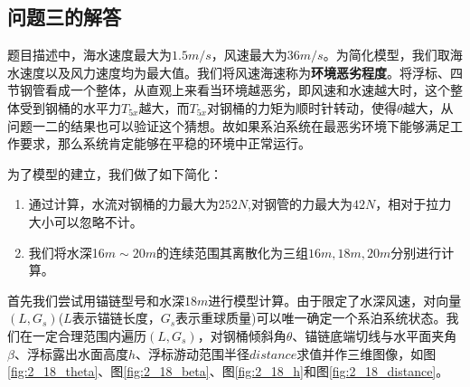 \documentclass{cumcm}
\begin{document}
\subsection{问题三的解答}
题目描述中，海水速度最大为$1.5m/s$，风速最大为$36m/s$。为简化模型，我们取海水速度以及风力速度均为最大值。我们将风速海速称为\textbf{环境恶劣程度}。将浮标、四节钢管看成一个整体，从直观上来看当环境越恶劣，即风速和水速越大时，这个整体受到钢桶的水平力$T_{5x}$越大，而$T_{5x}$对钢桶的力矩为顺时针转动，使得$\theta$越大，从问题一二的结果也可以验证这个猜想。故如果系泊系统在最恶劣环境下能够满足工作要求，那么系统肯定能够在平稳的环境中正常运行。\par
为了模型的建立，我们做了如下简化：
\begin{enumerate}
	\item 通过计算，水流对钢桶的力最大为$252N$,对钢管的力最大为$42N$，相对于拉力大小可以忽略不计。
	\item
	我们将水深16$m\sim 20m$的连续范围其离散化为三组$16m,18m,20m$分别进行计算。
\end{enumerate}\par 
首先我们尝试用锚链型号\uppercase\expandafter{}和水深$18m$进行模型计算。由于限定了水深风速，对向量\\$(L,G_s)$($L$表示锚链长度，$G_s$表示重球质量)可以唯一确定一个系泊系统状态。我们在一定合理范围内遍历$(L,G_s)$，对钢桶倾斜角$\theta$、锚链底端切线与水平面夹角$\beta$、浮标露出水面高度$h$、浮标游动范围半径$distance$求值并作三维图像，如图\ref{fig:2_18_theta}、图\ref{fig:2_18_beta}、图\ref{fig:2_18_h}和图\ref{fig:2_18_distance}。
\end{document}
